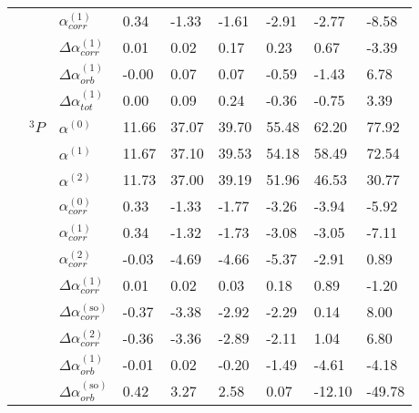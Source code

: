 \begin{longtable}{lllllllll}
      &       & $\alpha_{corr}^{(1)}$ &          0.34 &          -1.33 &       -1.61 &       -2.91 &       -2.77 &       -8.58 \\
      &       & $\Delta \alpha_{corr}^{(\text{1})}$ &          0.01 &           0.02 &        0.17 &        0.23 &        0.67 &       -3.39 \\
      &       & $\Delta \alpha_{orb}^{(\text{1})}$ &         -0.00 &           0.07 &        0.07 &       -0.59 &       -1.43 &        6.78 \\
      &       & $\Delta \alpha_{tot}^{(\text{1})}$ &          0.00 &           0.09 &        0.24 &       -0.36 &       -0.75 &        3.39 \\
      & $^3P$ & $\alpha^{(0)}$ &         11.66 &          37.07 &       39.70 &       55.48 &       62.20 &       77.92 \\
      &       & $\alpha^{(1)}$ &         11.67 &          37.10 &       39.53 &       54.18 &       58.49 &       72.54 \\
      &       & $\alpha^{(2)}$ &         11.73 &          37.00 &       39.19 &       51.96 &       46.53 &       30.77 \\
      &       & $\alpha_{corr}^{(0)}$ &          0.33 &          -1.33 &       -1.77 &       -3.26 &       -3.94 &       -5.92 \\
      &       & $\alpha_{corr}^{(1)}$ &          0.34 &          -1.32 &       -1.73 &       -3.08 &       -3.05 &       -7.11 \\
      &       & $\alpha_{corr}^{(2)}$ &         -0.03 &          -4.69 &       -4.66 &       -5.37 &       -2.91 &        0.89 \\
      &       & $\Delta \alpha_{corr}^{(\text{1})}$ &          0.01 &           0.02 &        0.03 &        0.18 &        0.89 &       -1.20 \\
      &       & $\Delta \alpha_{corr}^{(\text{so})}$ &         -0.37 &          -3.38 &       -2.92 &       -2.29 &        0.14 &        8.00 \\
      &       & $\Delta \alpha_{corr}^{(\text{2})}$ &         -0.36 &          -3.36 &       -2.89 &       -2.11 &        1.04 &        6.80 \\
      &       & $\Delta \alpha_{orb}^{(\text{1})}$ &         -0.01 &           0.02 &       -0.20 &       -1.49 &       -4.61 &       -4.18 \\
      &       & $\Delta \alpha_{orb}^{(\text{so})}$ &          0.42 &           3.27 &        2.58 &        0.07 &      -12.10 &      -49.78 \\

\end{longtable}
